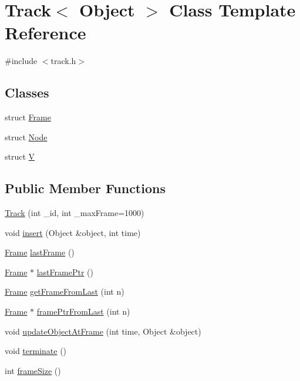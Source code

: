 \hypertarget{class_track}{\section{\-Track$<$ \-Object $>$ \-Class \-Template \-Reference}
\label{class_track}
}


{\ttfamily \#include $<$track.\-h$>$}

\subsection*{\-Classes}
\begin{DoxyCompactItemize}
\item 
struct \hyperlink{struct_track_1_1_frame}{\-Frame}
\item 
struct \hyperlink{struct_track_1_1_node}{\-Node}
\item 
struct \hyperlink{struct_track_1_1_v}{\-V}
\end{DoxyCompactItemize}
\subsection*{\-Public \-Member \-Functions}
\begin{DoxyCompactItemize}
\item 
\hyperlink{class_track_a3fd4137bc777af7f5eabf93464b240e6}{\-Track} (int \-\_\-id, int \-\_\-max\-Frame=1000)
\item 
void \hyperlink{class_track_a4d8f8a0343b037a522d702d82becf687}{insert} (\-Object \&object, int time)
\item 
\hyperlink{struct_track_1_1_frame}{\-Frame} \hyperlink{class_track_aeed84e499898f72d76d665e86e33ce8a}{last\-Frame} ()
\item 
\hyperlink{struct_track_1_1_frame}{\-Frame} $\ast$ \hyperlink{class_track_ad63a6288ce2add6286caf97ab1f86c88}{last\-Frame\-Ptr} ()
\item 
\hyperlink{struct_track_1_1_frame}{\-Frame} \hyperlink{class_track_ab1aa988f72821caf1b540cb7ad3bb4ca}{get\-Frame\-From\-Last} (int n)
\item 
\hyperlink{struct_track_1_1_frame}{\-Frame} $\ast$ \hyperlink{class_track_ac7a55bb36fb06699fce787360153536c}{frame\-Ptr\-From\-Last} (int n)
\item 
void \hyperlink{class_track_adad8d1dfac6b1a5b235a7ed4ec6ba256}{update\-Object\-At\-Frame} (int time, \-Object \&object)
\item 
void \hyperlink{class_track_a1cfb242fd6e3ddb4763ff4be83d8b749}{terminate} ()
\item 
int \hyperlink{class_track_aced0edd29cf0403972d70920b158116e}{frame\-Size} ()
\end{DoxyCompactItemize}
